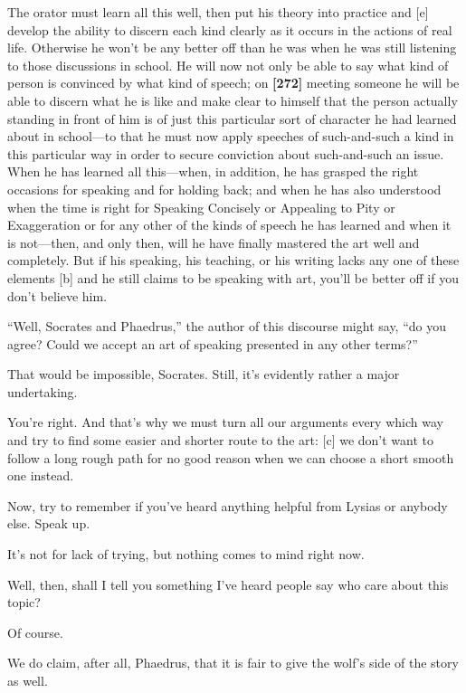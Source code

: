 The orator must learn all this well, then put his theory into practice
and {[}e{]} develop the ability to discern each kind clearly as it
occurs in the actions of real life. Otherwise he won't be any better off
than he was when he was still listening to those discussions in school.
He will now not only be able to say what kind of person is convinced by
what kind of speech; on {\bf {[}272{]}} meeting someone he will be able
to discern what he is like and make clear to himself that the person
actually standing in front of him is of just this particular sort of
character he had learned about in school---to that he must now apply
speeches of such-and-such a kind in this particular way in order to
secure conviction about such-and-such an issue. When he has learned all
this---when, in addition, he has grasped the right occasions for
speaking and for holding back; and when he has also understood when the
time is right for Speaking Concisely or Appealing to Pity or
Exaggeration or for any other of the kinds of speech he has learned and
when it is not---then, and only then, will he have finally mastered the
art well and completely. But if his speaking, his teaching, or his
writing lacks any one of these elements {[}b{]} and he still claims to
be speaking with art, you'll be better off if you don't believe him.

“Well, Socrates and Phaedrus,” the author of this discourse might say,
“do you agree? Could we accept an art of speaking presented in any other
terms?”

\sayphaedrus That would be impossible, Socrates. Still, it's evidently
rather a major undertaking.

\saysocrates You're right. And that's why we must turn all our arguments
every which way and try to find some easier and shorter route to the
art: {[}c{]} we don't want to follow a long rough path for no good
reason when we can choose a short smooth one instead.

Now, try to remember if you've heard anything helpful from Lysias or
anybody else. Speak up.

\sayphaedrus It's not for lack of trying, but nothing comes to mind right
now.

\saysocrates Well, then, shall I tell you something I've heard people say
who care about this topic?

\sayphaedrus Of course.

\saysocrates We do claim, after all, Phaedrus, that it is fair to give the
wolf's side of the story as well.

